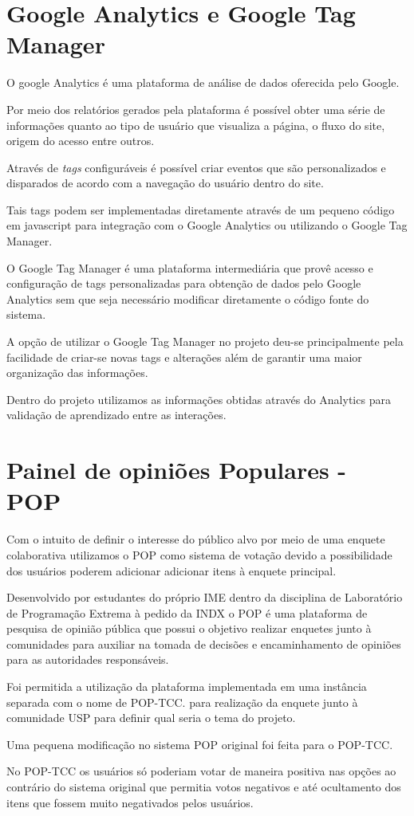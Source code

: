 \section{Google Analytics e Google Tag Manager}
\par O google Analytics é uma plataforma de análise de dados oferecida pelo Google.
\par Por meio dos relatórios gerados pela plataforma é possível obter uma série de informações quanto ao tipo de usuário que visualiza a página, o fluxo do site, origem do acesso entre outros.
\par Através de \emph{tags} configuráveis é possível criar eventos que são personalizados e disparados de acordo com a navegação do usuário dentro do site.
\par Tais tags podem ser implementadas diretamente através de um pequeno código em javascript para integração com o Google Analytics ou utilizando o Google Tag Manager.
\par O Google Tag Manager é uma plataforma intermediária que provê acesso e configuração de tags personalizadas para obtenção de dados pelo Google Analytics sem que seja necessário modificar diretamente o código fonte do sistema.
\par A opção de utilizar o Google Tag Manager no projeto deu-se principalmente pela facilidade de criar-se novas tags e alterações além de garantir uma maior organização das informações.
\par Dentro do projeto utilizamos as informações obtidas através do Analytics para validação de aprendizado entre as interações.

\section{Painel de opiniões Populares - POP}
\par Com o intuito de definir o interesse do público alvo por meio de uma enquete colaborativa utilizamos o POP como sistema de votação devido a possibilidade dos usuários poderem adicionar adicionar itens à enquete principal.
\par Desenvolvido por estudantes do próprio IME dentro da disciplina de Laboratório de Programação Extrema à pedido da INDX o POP é uma plataforma de pesquisa de opinião pública que possui o objetivo realizar enquetes junto à comunidades para auxiliar na tomada de decisões e encaminhamento de opiniões para as autoridades responsáveis.
\par Foi permitida a utilização da plataforma implementada em uma instância separada com o nome de POP-TCC. para realização da enquete junto à comunidade USP para definir qual seria o tema do projeto.
\par Uma pequena modificação no sistema POP original foi feita para o POP-TCC.
\par No POP-TCC os usuários só poderiam votar de maneira positiva nas opções ao contrário do sistema original que permitia votos negativos e até ocultamento dos itens que fossem muito negativados pelos usuários.

